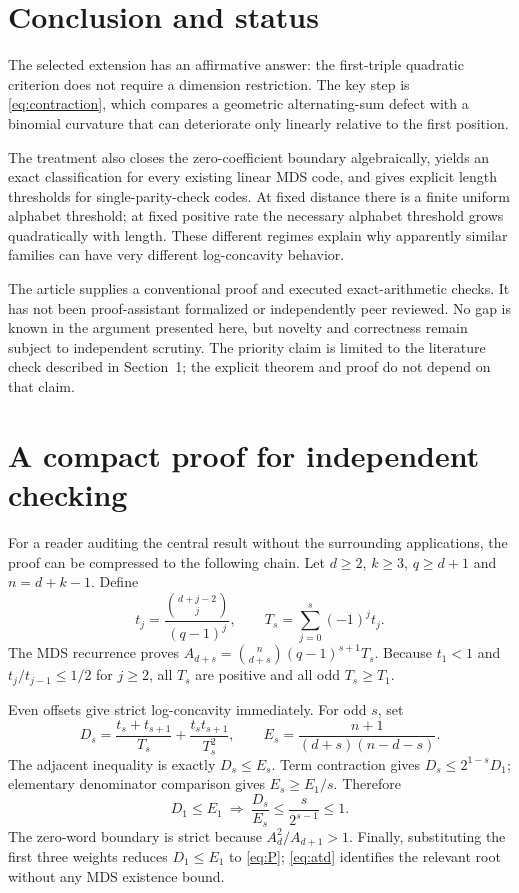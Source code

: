 \documentclass[11pt,letterpaper]{article}
\numberwithin{equation}{section}
\theoremstyle{definition}
\begin{document}
\section{Conclusion and status}
The selected extension has an affirmative answer: the first-triple
quadratic criterion does not require a dimension restriction. The
key step is \eqref{eq:contraction}, which compares a geometric
alternating-sum defect with a binomial curvature that can deteriorate
only linearly relative to the first position.

The treatment also closes the zero-coefficient boundary algebraically,
yields an exact classification for every existing linear MDS code,
and gives explicit length thresholds for single-parity-check codes.
At fixed distance there is a finite uniform alphabet threshold; at
fixed positive rate the necessary alphabet threshold grows
quadratically with length. These different regimes explain why
apparently similar families can have very different log-concavity
behavior.

The article supplies a conventional proof and executed exact-arithmetic
checks. It has not been proof-assistant formalized or independently
peer reviewed. No gap is known in the argument presented here, but
novelty and correctness remain subject to independent scrutiny.
The priority claim is limited to the literature check described in
Section~1; the explicit theorem and proof do not depend on that
claim.

\appendix
\section{A compact proof for independent checking}
For a reader auditing the central result without the surrounding
applications, the proof can be compressed to the following chain.
Let $d\ge2$, $k\ge3$, $q\ge d+1$ and $n=d+k-1$. Define
\[
 t_j=\frac{\binom{d+j-2}{j}}{(q-1)^j},\qquad
 T_s=\sum_{j=0}^s(-1)^jt_j.
\]
The MDS recurrence proves
$A_{d+s}=\binom n{d+s}(q-1)^{s+1}T_s$.
Because $t_1<1$ and $t_j/t_{j-1}\le1/2$ for $j\ge2$, all $T_s$
are positive and all odd $T_s\ge T_1$.

Even offsets give strict log-concavity immediately. For odd $s$,
set
\[
 D_s=\frac{t_s+t_{s+1}}{T_s}+\frac{t_st_{s+1}}{T_s^2},\qquad
 E_s=\frac{n+1}{(d+s)(n-d-s)}.
\]
The adjacent inequality is exactly $D_s\le E_s$.
Term contraction gives $D_s\le2^{1-s}D_1$; elementary denominator
comparison gives $E_s\ge E_1/s$. Therefore
\[
 D_1\le E_1\ \Longrightarrow\
 \frac{D_s}{E_s}\le \frac{s}{2^{s-1}}\le1.
\]
The zero-word boundary is strict because
$A_d^2/A_{d+1}>1$. Finally, substituting the first three weights
reduces $D_1\le E_1$ to \eqref{eq:P}; \eqref{eq:atd} identifies the
relevant root without any MDS existence bound.
\end{document}
